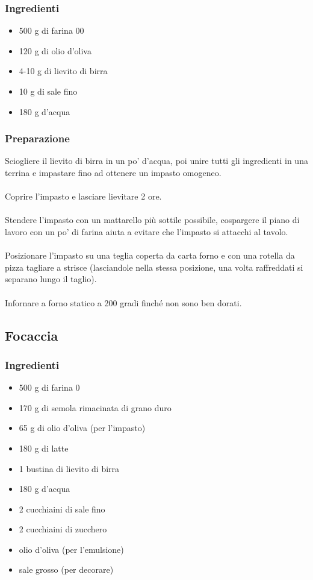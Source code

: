 \documentclass[12pt, a4paper]{article}
\begin{document}
\subsubsection{Ingredienti}
\begin{itemize}
\item	500 g di farina 00
\item	120 g di olio d'oliva
\item	4-10 g di lievito di birra
\item	10 g di sale fino
\item	180 g d'acqua
\end{itemize}

\subsubsection{Preparazione}
	Sciogliere il lievito di birra in un po' d'acqua, poi unire tutti
	gli ingredienti in una terrina e impastare fino ad ottenere 
	un impasto omogeneo.\\\\
	Coprire l'impasto e lasciare lievitare 2 ore.\\\\
	Stendere l'impasto con un mattarello più sottile possibile,
	cospargere il piano di lavoro con un po' di farina aiuta a evitare
	che l'impasto si attacchi al tavolo.\\\\
	Posizionare l'impasto su una teglia coperta da carta forno e con
	una rotella da pizza tagliare a strisce (lasciandole nella stessa
	posizione, una volta raffreddati si separano lungo il taglio).\\\\
	Infornare a forno statico a 200 gradi finché non sono ben dorati.
\clearpage

\subsection{Focaccia}

\subsubsection{Ingredienti}
\begin{itemize}
\item	500 g di farina 0
\item	170 g di semola rimacinata di grano duro
\item	65 g di olio d'oliva (per l'impasto)
\item	180 g di latte
\item	1 bustina di lievito di birra
\item 	180 g d'acqua
\item	2 cucchiaini di sale fino
\item	2 cucchiaini di zucchero
\item	olio d'oliva (per l'emulsione)
\item	sale grosso (per decorare)
\end{itemize}
\end{document}
